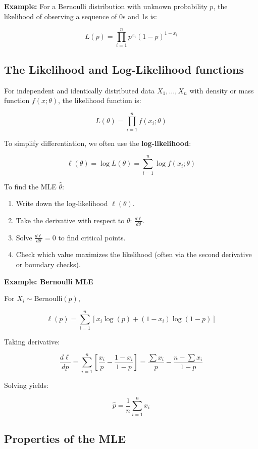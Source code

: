 \documentclass{book}
\begin{document}
\textbf{Example:} For a Bernoulli distribution with unknown probability $p$, the likelihood of observing a sequence of 0s and 1s is:

\[
L(p) = \prod_{i=1}^{n} p^{x_i}(1-p)^{1 - x_i}
\]

\subsection{The Likelihood and Log-Likelihood functions}

For independent and identically distributed data $X_1, \dots, X_n$ with density or mass function $f(x; \theta)$, the likelihood function is:

\[
L(\theta) = \prod_{i=1}^{n} f(x_i; \theta)
\]

To simplify differentiation, we often use the \textbf{log-likelihood}:

\[
\ell(\theta) = \log L(\theta) = \sum_{i=1}^{n} \log f(x_i; \theta)
\]

To find the MLE $\hat{\theta}$:

\begin{enumerate}
    \item Write down the log-likelihood $\ell(\theta)$.
    \item Take the derivative with respect to $\theta$: $\frac{d\ell}{d\theta}$.
    \item Solve $\frac{d\ell}{d\theta} = 0$ to find critical points.
    \item Check which value maximizes the likelihood (often via the second derivative or boundary checks).
\end{enumerate}

\textbf{Example: Bernoulli MLE}

For $X_i \sim \text{Bernoulli}(p)$,

\[
\ell(p) = \sum_{i=1}^{n} \left[x_i \log(p) + (1 - x_i)\log(1 - p)\right]
\]

Taking derivative:

\[
\frac{d\ell}{dp} = \sum_{i=1}^{n} \left[\frac{x_i}{p} - \frac{1 - x_i}{1 - p}\right] = \frac{\sum x_i}{p} - \frac{n - \sum x_i}{1 - p}
\]

Solving yields:

\[
\hat{p} = \frac{1}{n} \sum_{i=1}^{n} x_i
\]

\subsection{Properties of the MLE}
\end{document}
